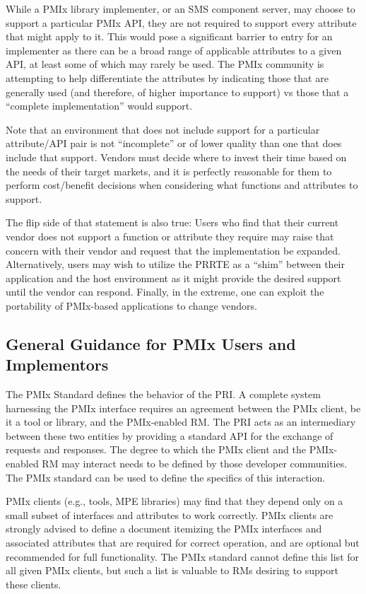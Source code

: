 While a \ac{PMIx} library implementer, or an \ac{SMS} component server, may choose to support a particular \ac{PMIx} \ac{API}, they are not required to support every attribute that might apply to it. This would pose a significant barrier to entry for an implementer as there can be a broad range of applicable attributes to a given \ac{API}, at least some of which may rarely be used. The \ac{PMIx} community is attempting to help differentiate the attributes by indicating those that are generally used (and therefore, of higher importance to support) vs those that a ``complete implementation'' would support.

Note that an environment that does not include support for a particular attribute/\ac{API} pair is not ``incomplete'' or of lower quality than one that does include that support. Vendors must decide where to invest their time based on the needs of their target markets, and it is perfectly reasonable for them to perform cost/benefit decisions when considering what functions and attributes to support.

The flip side of that statement is also true: Users who find that their current vendor does not support a function or attribute they require may raise that concern with their vendor and request that the implementation be expanded. Alternatively, users may wish to utilize the \ac{PRRTE} as a ``shim'' between their application and the host environment as it might provide the desired support until the vendor can respond. Finally, in the extreme, one can exploit the portability of PMIx-based applications to change vendors.

\subsection{General Guidance for PMIx Users and Implementors}

The \ac{PMIx} Standard defines the behavior of the \acf{PRI}.
A complete system harnessing the \ac{PMIx} interface requires an agreement between the \ac{PMIx} client, be it a tool or library, and the \ac{PMIx}-enabled \ac{RM}.
The \ac{PRI} acts as an intermediary between these two entities by providing a standard API for the exchange of requests and responses.
The degree to which the \ac{PMIx} client and the \ac{PMIx}-enabled \ac{RM} may interact needs to be defined by those developer communities.
The \ac{PMIx} standard can be used to define the specifics of this interaction.

\ac{PMIx} clients (e.g., tools, \ac{MPE} libraries) may find that they depend only on a small subset of interfaces and attributes to work correctly.
\ac{PMIx} clients are strongly advised to define a document itemizing the \ac{PMIx} interfaces and associated attributes that are required for correct operation, and are optional but recommended for full functionality.
The \ac{PMIx} standard cannot define this list for all given \ac{PMIx} clients, but such a list is valuable to \acp{RM} desiring to support these clients.

